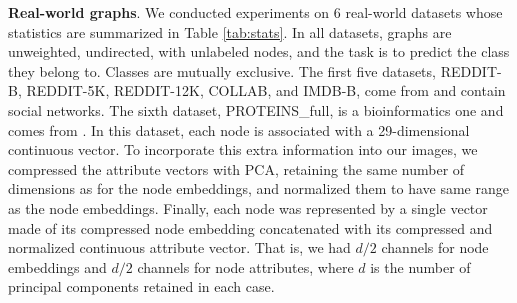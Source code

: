 \documentclass[runningheads]{llncs}
\begin{document}
\noindent \textbf{Real-world graphs}.
We conducted experiments on 6 real-world datasets whose statistics are summarized in Table \ref{tab:stats}. In all datasets, graphs are unweighted, undirected, with unlabeled nodes, and the task is to predict the class they belong to. Classes are mutually exclusive. The first five datasets, REDDIT-B, REDDIT-5K, REDDIT-12K, COLLAB, and IMDB-B, come from \cite{yanardag2015deep} and contain social networks. The sixth dataset, PROTEINS\_full, is a bioinformatics one and comes from \cite{KKMMN2016,borgwardt2005protein}. In this dataset, each node is associated with a 29-dimensional continuous vector. To incorporate this extra information into our images, we compressed the attribute vectors with PCA, retaining the same number of dimensions as for the node embeddings, and normalized them to have same range as the node embeddings. Finally, each node was represented by a single vector made of its compressed node embedding concatenated with its compressed and normalized continuous attribute vector. That is, we had $d/2$ channels for node embeddings and $d/2$ channels for node attributes, where $d$ is the number of principal components retained in each case.

\vspace{-0.5cm}

\begin{table*}[h]
\begin{center}
\captionsetup{justification=centering, size=small}
\caption{\label{tab:stats} Statistics of the social network datasets (first 5 columns) and the bioinformatics dataset used in our experiments.}
\end{center}
\end{table*}
\end{document}
